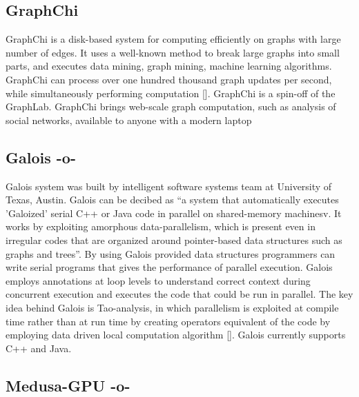 \subsection{GraphChi}

GraphChi is a disk-based system for computing efficiently on graphs
with large number of edges.  It uses a well-known method to break
large graphs into small parts, and executes data mining, graph mining,
machine learning algorithms. GraphChi can process over one hundred
thousand graph updates per second, while simultaneously performing
computation [\cite{GraphChi}]. GraphChi is a spin-off of the
GraphLab. GraphChi brings web-scale graph computation, such as
analysis of social networks, available to anyone with a modern laptop

     
\subsection{Galois -o-}
     
Galois system was built by intelligent software systems team at
University of Texas, Austin. Galois can be decibed as ``a system that
automatically executes 'Galoized' serial C++ or Java code in
parallel on shared-memory machinesv\cite{www-galoisSite}. It works by
exploiting amorphous data-parallelism, which is present even in
irregular codes that are organized around pointer-based data
structures such as graphs and trees''. By using Galois provided data
structures programmers can write serial programs that gives the
performance of parallel execution. Galois employs annotations at loop
levels to understand correct context during concurrent execution and
executes the code that could be run in parallel. The key idea behind
Galois is Tao-analysis, in which parallelism is exploited at compile
time rather than at run time by creating operators equivalent of the
code by employing data driven local computation
algorithm [\cite{taoParallelismPaper}]. Galois currently supports C++
and Java.


     
\subsection{Medusa-GPU -o-}
     
